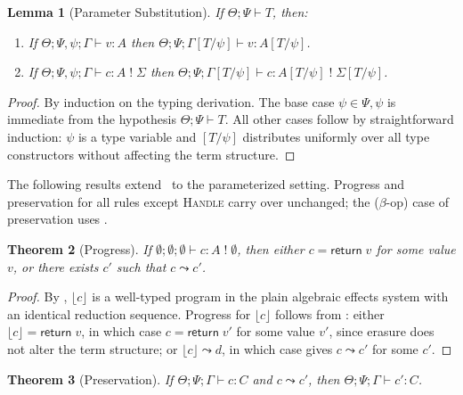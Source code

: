 \documentclass{article}
\newtheorem{theorem}{Theorem}[section]
\newtheorem{lemma}[theorem]{Lemma}
\theoremstyle{definition}
\theoremstyle{remark}
\newcommand{\comp}[2]{#1\;!\;#2}
\newcommand{\ret}{\mathsf{return}\;}
\newcommand{\G}{\Gamma}
\newcommand{\Sig}{\Sigma}
\newcommand{\tj}[3]{#1; #2 \vdash #3}                            %
\newcommand{\vj}[5]{#1; #2; #3 \vdash #4 : #5}                   %
\newcommand{\cj}[6]{#1; #2; #3 \vdash #4 : \comp{#5}{#6}}        %
\newcommand{\cjp}[5]{#1; #2; #3 \vdash #4 : #5}                  %
\begin{document}
\begin{lemma}[Parameter Substitution]\label{lem:param-subst}
  If $\tj{\Theta}{\Psi}{T}$, then:
  \begin{enumerate}
    \item If $\vj{\Theta}{\Psi, \psi}{\G}{v}{A}$ then $\vj{\Theta}{\Psi}{\G[T/\psi]}{v}{A[T/\psi]}$.
    \item If $\cj{\Theta}{\Psi, \psi}{\G}{c}{A}{\Sig}$ then $\cj{\Theta}{\Psi}{\G[T/\psi]}{c}{A[T/\psi]}{\Sig[T/\psi]}$.
  \end{enumerate}
\end{lemma}

\begin{proof}
  By induction on the typing derivation.
  The base case $\psi \in \Psi, \psi$ is immediate from the hypothesis $\tj{\Theta}{\Psi}{T}$.
  All other cases follow by straightforward induction: $\psi$ is a type variable and $[T/\psi]$ distributes uniformly over all type constructors without affecting the term structure.
\end{proof}

The following results extend~\cite{kammar_handlers_2013} to the parameterized setting.
Progress and preservation for all rules except \textsc{Handle} carry over unchanged;
the ($\beta$-op) case of preservation uses .

\begin{theorem}[Progress]\label{thm:progress}
  If $\cj{\emptyset}{\emptyset}{\emptyset}{c}{A}{\emptyset}$, then either $c = \ret v$ for some value $v$,
  or there exists $c'$ such that $c \leadsto c'$.
\end{theorem}

\begin{proof}
  By , $\lfloor c \rfloor$ is a well-typed program in the plain algebraic effects system with an identical reduction sequence.
  Progress for $\lfloor c \rfloor$ follows from \cite{kammar_handlers_2013}: either $\lfloor c \rfloor = \ret v$, in which case $c = \ret v'$ for some value $v'$,
  since erasure does not alter the term structure; or $\lfloor c \rfloor \leadsto d$, in which case  gives $c \leadsto c'$ for some $c'$.
\end{proof}

\begin{theorem}[Preservation]\label{thm:preservation}
  If $\cjp{\Theta}{\Psi}{\G}{c}{C}$ and $c \leadsto c'$, then $\cjp{\Theta}{\Psi}{\G}{c'}{C}$.
\end{theorem}
\end{document}
